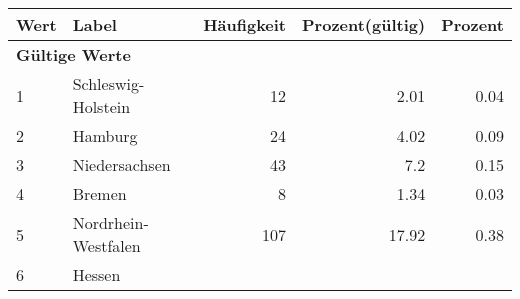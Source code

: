      \begin{longtable}{lXrrr}
     \toprule
     \textbf{Wert} & \textbf{Label} & \textbf{Häufigkeit} & \textbf{Prozent(gültig)} & \textbf{Prozent} \\
     \endhead
     \midrule
     \multicolumn{5}{l}{\textbf{Gültige Werte}}\\

     1 &
     \multicolumn{1}{X}{ Schleswig-Holstein   } &


       \num{12} &
       \num[round-mode=places,round-precision=2]{2,01} &
         \num[round-mode=places,round-precision=2]{0,04} \\

     2 &
     \multicolumn{1}{X}{ Hamburg   } &


       \num{24} &
       \num[round-mode=places,round-precision=2]{4,02} &
         \num[round-mode=places,round-precision=2]{0,09} \\

     3 &
     \multicolumn{1}{X}{ Niedersachsen   } &


       \num{43} &
       \num[round-mode=places,round-precision=2]{7,2} &
         \num[round-mode=places,round-precision=2]{0,15} \\

     4 &
     \multicolumn{1}{X}{ Bremen   } &


       \num{8} &
       \num[round-mode=places,round-precision=2]{1,34} &
         \num[round-mode=places,round-precision=2]{0,03} \\

     5 &
     \multicolumn{1}{X}{ Nordrhein-Westfalen   } &


       \num{107} &
       \num[round-mode=places,round-precision=2]{17,92} &
         \num[round-mode=places,round-precision=2]{0,38} \\

     6 &
     \multicolumn{1}{X}{ Hessen   } &



\end{longtable}

